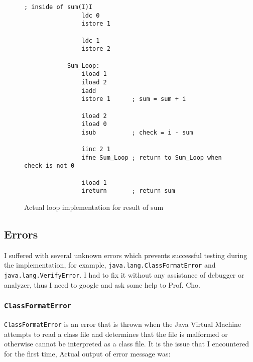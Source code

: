 \documentclass[a4paper, 12pt]{article}
\begin{document}
        \begin{figure}[H]
            \begin{lstlisting}[gobble=8]
            ; inside of sum(I)I
                ldc 0
                istore 1
            
                ldc 1
                istore 2
            
            Sum_Loop:
                iload 1     
                iload 2
                iadd
                istore 1      ; sum = sum + i
                
                iload 2
                iload 0
                isub          ; check = i - sum
            
                iinc 2 1
                ifne Sum_Loop ; return to Sum_Loop when check is not 0
            
                iload 1
                ireturn       ; return sum
            \end{lstlisting}
    
            \centering        
            \caption{Actual loop implementation for result of sum}
        \end{figure}
        
        \subsection{Errors}
        I suffered with several unknown errors which prevents successful testing during the implementation, for example, \texttt{java.lang.ClassFormatError} and \texttt{java.lang.VerifyError}. I had to fix it without any assistance of debugger or analyzer, thus I need to google and ask some help to Prof. Cho. 
    
            \subsubsection{\texttt{ClassFormatError}}
            \texttt{ClassFormatError} is an error that is thrown when the Java Virtual Machine attempts to read a class file and determines that the file is malformed or otherwise cannot be interpreted as a class file. \cite{oracle_cfe} It is the issue that I encountered for the first time, Actual output of error message was:
            
\end{document}
